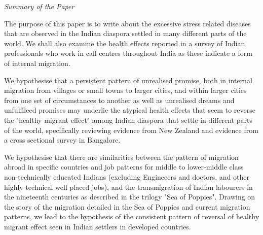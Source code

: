 \textit{Summary of the Paper} 

The purpose of this paper is to write about the excessive stress related diseases that are observed in the Indian diaspora settled in many different parts of the world. We shall also examine the health effects reported in a survey of Indian professionals who work in call centres throughout India as these indicate a form of internal migration. 

We hypothesise that a persistent pattern of unrealised promise, both in internal migration from villages or small towns to larger cities, and within larger cities from one set of circumstances to another as well as unrealised dreams and unfulfileed promises may underlie the atypical health effects that seem to reverse the "healthy migrant effect" among Indian diaspora that settle in different parts of the world, specifically reviewing evidence from New Zealand and evidence from a cross sectional survey in Bangalore. 

We hypothesise that there are similarities between the pattern of migration abroad in specific countries and job patterns for middle to lower-middle class non-technically educated Indians (excluding Engineeers and doctors, and other highly technical well placed jobs), and the transmigration of Indian labourers in the nineteenth centuries as described in the trilogy "Sea of Poppies". Drawing on the story of the migration detailed in the Sea of Poppies and current migration patterns, we lead to the hypothesis of the consistent pattern of reversal of healthy migrant effect seen in Indian settlers in developed countries. 
    